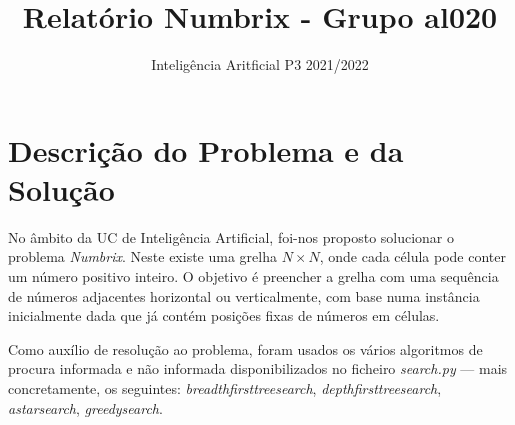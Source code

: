 \documentclass[12pt]{exam}
\title{Relatório Numbrix - Grupo al020}
\author{Inteligência Aritficial P3 2021/2022}
\date{}
\renewcommand\_{\textunderscore\linebreak[1]}
\begin{document}
    \maketitle
    \vspace{-3.5em}
    \section{Descrição do Problema e da Solução}
        \indent No âmbito da UC de Inteligência Artificial, foi-nos proposto solucionar o problema \textit{Numbrix}.
        Neste existe uma grelha \textbf{$N\times N$}, onde cada célula pode conter um número positivo inteiro.
        O objetivo é preencher a grelha com uma sequência de números adjacentes horizontal ou verticalmente, com base numa instância inicialmente
        dada que já contém posições fixas de números em células.

        \indent Como auxílio de resolução ao problema, foram usados os vários algoritmos de procura informada e não informada disponibilizados no ficheiro \textit{search.py} — mais concretamente, os seguintes: \textit{breadth\_first\_tree\_search}, \textit{depth\_first\_tree\_search}, \textit{astar\_search}, \textit{greedy\_search}.
\end{document}
